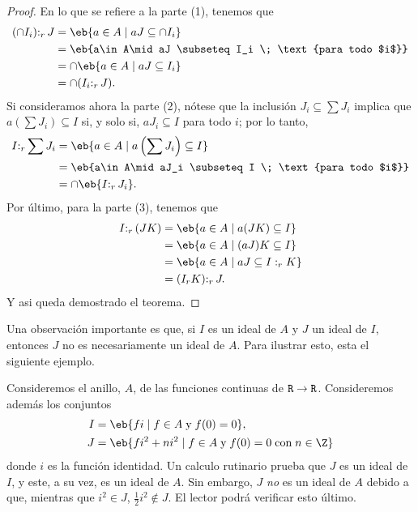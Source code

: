 \begin{proof}
	En lo que se refiere a la parte (1), tenemos que
	\begin{align*}
	(\cap I_i)\mathpunct{:}_rJ &= \eb{a\in A\mid aJ \subseteq \cap I_i} \\
	&= \eb{a\in A\mid aJ \subseteq I_i \; \text{para todo $i$}} \\
	&= \cap \eb{a\in A\mid aJ \subseteq I_i} \\
	&= \cap (I_i\mathpunct{:}_rJ). 
	\end{align*}
	Si consideramos ahora la parte (2), nótese que la inclusión $J_i \subseteq \sum J_i$ implica que $a(\sum J_i) \subseteq I$ si, y solo si, $aJ_i\subseteq I$ para todo $i$; por lo tanto,
	\begin{align*}
	I\mathpunct{:}_r\sum J_i &= \eb{a\in A\mid a\left( \sum J_i \right) \subseteq I} \\
				 &= \eb{a\in A\mid aJ_i \subseteq I \; \text{para todo $i$}} \\
				 &= \cap \eb{I\mathpunct{:}_rJ_i}.
	\end{align*}
	Por último, para la parte (3), tenemos que
	\begin{align*}
	I\mathpunct{:}_r(JK) &= \eb{a\in A\mid a(JK) \subseteq I} \\
			 &= \eb{a\in A\mid (aJ)K \subseteq I} \\
			 &= \eb{a\in A\mid aJ \subseteq I:_rK} \\
			 &= (I_rK)\mathpunct{:}_rJ.
	\end{align*}
	Y asi queda demostrado el teorema.
\end{proof}
Una observación importante es que, si $I$ es un ideal de $A$ y $J$ un ideal de $I$, entonces $J$ no es necesariamente un ideal de $A$. Para ilustrar esto, esta el siguiente ejemplo.
\begin{ejem}
	Consideremos el anillo, $A$, de las funciones continuas de $\texttt{R} \to \texttt{R}$. Consideremos además los conjuntos
	\begin{align*}
	I &= \eb{fi\mid f\in A \;\text{y}\;f(0)=0}, \\
	J &= \eb{fi^2+ni^2\mid f\in A\;\text{y}\; f(0)=0 \;\text{con}\; n\in \Z}
	\end{align*}
	donde $i$ es la función identidad. Un calculo rutinario prueba que $J$ es un ideal de $I$, y este, a su vez, es un ideal de $A$. Sin embargo, $J$ \textit{no} es un ideal de $A$ debido a que, mientras que $i^2\in J$, $\frac{1}{2}i^2\notin J$. El lector podrá verificar esto último.
\end{ejem} 
